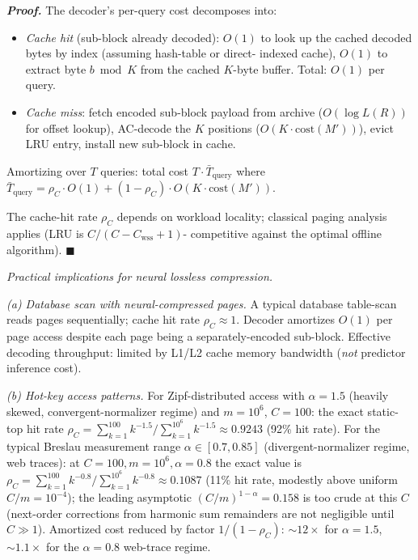 \documentclass[
]{article}
\begin{document}
\emph{\textbf{Proof.}} The decoder's per-query cost decomposes into:
\begin{itemize}
\item \emph{Cache hit} (sub-block already decoded): $O(1)$ to look up
the cached decoded bytes by index (assuming hash-table or direct-
indexed cache), $O(1)$ to extract byte $b \bmod K$ from the cached
$K$-byte buffer. Total: $O(1)$ per query.
\item \emph{Cache miss}: fetch encoded sub-block payload from archive
($O(\log L(R))$ for offset lookup), AC-decode the $K$ positions
($O(K \cdot \mathrm{cost}(M'))$), evict LRU entry, install new
sub-block in cache.
\end{itemize}
Amortizing over $T$ queries: total cost $T \cdot \bar{T}_{\mathrm{query}}$
where $\bar{T}_{\mathrm{query}} = \rho_C \cdot O(1) + (1 - \rho_C)
\cdot O(K \cdot \mathrm{cost}(M'))$.

The cache-hit rate $\rho_C$ depends on workload locality; classical
paging analysis applies (LRU is $C/(C - C_{\mathrm{wss}} + 1)$-
competitive against the optimal offline algorithm).
\hfill$\blacksquare$

\emph{Practical implications for neural lossless compression.}

\emph{(a) Database scan with neural-compressed pages.} A typical
database table-scan reads pages sequentially; cache hit rate $\rho_C
\approx 1$. Decoder amortizes $O(1)$ per page access despite each
page being a separately-encoded sub-block. Effective decoding
throughput: limited by L1/L2 cache memory bandwidth (\textit{not}
predictor inference cost).

\emph{(b) Hot-key access patterns.} For Zipf-distributed access with
$\alpha = 1.5$ (heavily skewed, convergent-normalizer regime) and
$m = 10^6$, $C = 100$: the exact static-top hit rate
$\rho_C = \sum_{k=1}^{100} k^{-1.5} / \sum_{k=1}^{10^6} k^{-1.5}
\approx 0.9243$ (92\% hit rate). For the typical Breslau measurement
range $\alpha \in [0.7, 0.85]$ (divergent-normalizer regime, web
traces): at $C=100, m= 10^6, \alpha=0.8$ the exact value is
$\rho_C = \sum_{k=1}^{100} k^{-0.8} / \sum_{k=1}^{10^6} k^{-0.8}
\approx 0.1087$ (11\% hit rate, modestly above uniform $C/m =
10^{-4}$); the leading asymptotic $(C/m)^{1-\alpha} = 0.158$ is too
crude at this $C$ (next-order corrections from harmonic sum
remainders are not negligible until $C \gg 1$).
Amortized cost reduced by factor $1/(1-\rho_C)$: $\sim 12\times$ for
$\alpha=1.5$, $\sim 1.1\times$ for the $\alpha=0.8$ web-trace regime.
\end{document}
